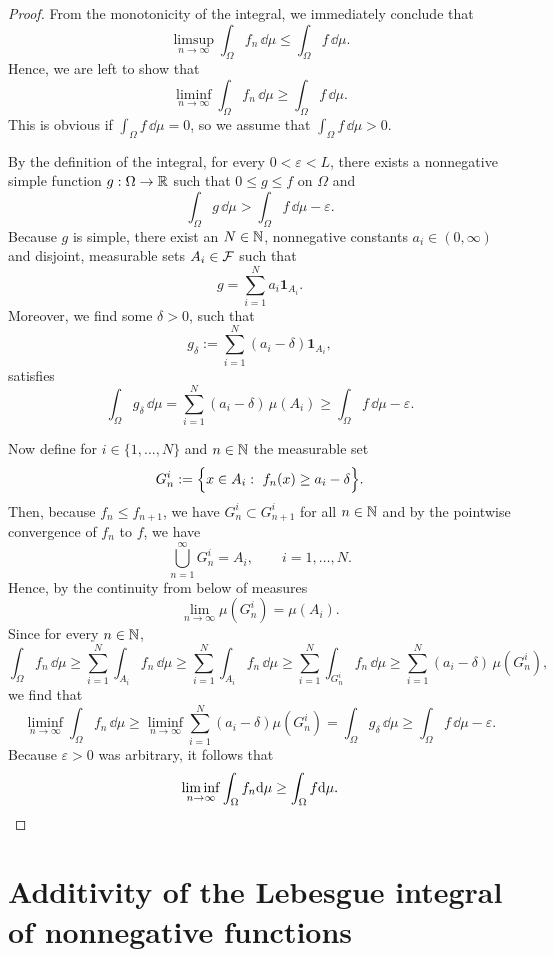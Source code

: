 \begin{proof}
	From the monotonicity of the integral, we immediately conclude that
	\[
	\limsup_{n \to \infty} \int_\Omega f_n\, \dd \mu \leq \int_\Omega f\, \dd \mu.
	\]
	Hence, we are left to show that
	\[
	\liminf_{n \to \infty } \int_\Omega f_n\, \dd \mu \geq \int_\Omega f\, \dd \mu.
	\]
	This is obvious if $\int_\Omega f\, \dd \mu = 0$, so we assume that $\int_\Omega f\, \dd \mu >0$.
	
	By the definition of the integral, for every $0<\varepsilon<L$, there exists a nonnegative simple function $g: \Omega \to \mathbb R$ such that $0\le g \leq f$ on $\Omega$ and
	\[
		\int_\Omega g\, \dd \mu > \int_\Omega f\, \dd \mu - \varepsilon.
	\]
	Because $g$ is simple, there exist an $N \in \mathbb N$, nonnegative constants $a_i \in (0,\infty)$ and disjoint, measurable sets $A_i \in \mathcal F$ such that
	\[
		g = \sum_{i=1}^N a_i \mathbf{1}_{A_i}.
	\]
	Moreover, we find some $\delta>0$, such that
	\[
		g_\delta:= \sum_{i=1}^N (a_i-\delta)\mathbf{1}_{A_i}, 
	\]
	satisfies
	\[
		\int_\Omega g_\delta\,\dd \mu = \sum_{i=1}^N(a_i-\delta)\,\mu(A_i) \ge \int_\Omega f\,\dd\mu - \varepsilon. 
	\]
	
	Now define for $i \in \{ 1, \dots, N\}$ and $n \in \mathbb N$ the measurable set
	\[
	G_n^i := \Bigl\{ x \in A_i : \ f_n(x) \geq a_i - \delta \Bigr\}.
	\]
	Then, because $f_n \leq f_{n+1}$, we have $G_n^i \subset G_{n+1}^i$ for all $n \in \mathbb N$ and by the pointwise convergence of $f_n$ to $f$, we have
	\[
	\bigcup_{n=1}^\infty G_n^i = A_i,\qquad i=1,\ldots,N.
	\]
	Hence, by the continuity from below of measures
	\[
		\lim_{n \to \infty}\mu(G_n^i) = \mu(A_i).
	\]
	Since for every $n\in\mathbb N$,
		\[
		\int_\Omega f_n\,\dd\mu \ge \sum_{i=1}^N \int_{A_i} f_n\,\dd \mu \ge \sum_{i=1}^N \int_{A_i} f_n\,\dd \mu \ge \sum_{i=1}^N \int_{G_n^i} f_n\,\dd \mu \ge \sum_{i=1}^N (a_i-\delta)\,\mu(G_n^i),
	\]
	we find that
	\[
		\liminf_{n \to \infty} \int_\Omega f_n\, \dd \mu \ge  \liminf_{n \to \infty } \sum_{i=1}^N (a_i - \delta) \mu(G_n^i) = \int_\Omega g_\delta\,\dd\mu \ge \int_\Omega f\,\dd\mu - \varepsilon. 
	\]
	Because $\varepsilon>0$ was arbitrary, it follows that
	\[
	\liminf_{n \to \infty} \int_\Omega f_n \mathrm{d} \mu \geq \int_\Omega f \mathrm{d} \mu.\qedhere
	\]	
\end{proof}




\section{Additivity of the Lebesgue integral of nonnegative functions}

